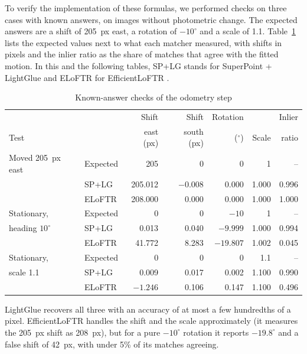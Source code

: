 \documentclass[english, Lau, oneside]{sapthesis}%
\begin{document}
To verify the implementation of these formulas, we performed checks on three cases with known answers, on images without photometric change. The expected answers are a shift of 205~px east, a rotation of $-10^\circ$ and a scale of 1.1. Table~\ref{tab:vo-known-answer} lists the expected values next to what each matcher measured, with shifts in pixels and the inlier ratio as the share of matches that agree with the fitted motion. In this and the following tables, SP+LG stands for SuperPoint + LightGlue and ELoFTR for EfficientLoFTR \citep{wang2024efficientloftr}.

\begin{table}[!htbp]
  \centering
  \caption{Known-answer checks of the odometry step}
  \label{tab:vo-known-answer}
  \small
  \begin{tabular}{llrrrrr}
    \toprule
     & & Shift & Shift & Rotation & & Inlier \\
    Test & & east (px) & south (px) & ($^\circ$) & Scale & ratio \\
    \midrule
    Moved 205~px east & Expected & 205 & 0 & 0 & 1 & -- \\
     & SP+LG & 205.012 & $-0.008$ & 0.000 & 1.000 & 0.996 \\
     & ELoFTR & 208.000 & 0.000 & 0.000 & 1.000 & 1.000 \\
    \addlinespace
    Stationary, & Expected & 0 & 0 & $-10$ & 1 & -- \\
    \quad heading $10^\circ$ & SP+LG & 0.013 & 0.040 & $-9.999$ & 1.000 & 0.994 \\
     & ELoFTR & 41.772 & 8.283 & $-19.807$ & 1.002 & 0.045 \\
    \addlinespace
    Stationary, & Expected & 0 & 0 & 0 & 1.1 & -- \\
    \quad scale 1.1 & SP+LG & 0.009 & 0.017 & 0.002 & 1.100 & 0.990 \\
     & ELoFTR & $-1.246$ & 0.106 & 0.147 & 1.100 & 0.496 \\
    \bottomrule
  \end{tabular}
\end{table}

LightGlue recovers all three with an accuracy of at most a few hundredths of a pixel. EfficientLoFTR handles the shift and the scale approximately (it measures the 205~px shift as 208~px), but for a pure $-10^\circ$ rotation it reports $-19.8^\circ$ and a false shift of 42~px, with under 5\% of its matches agreeing.
\end{document}
